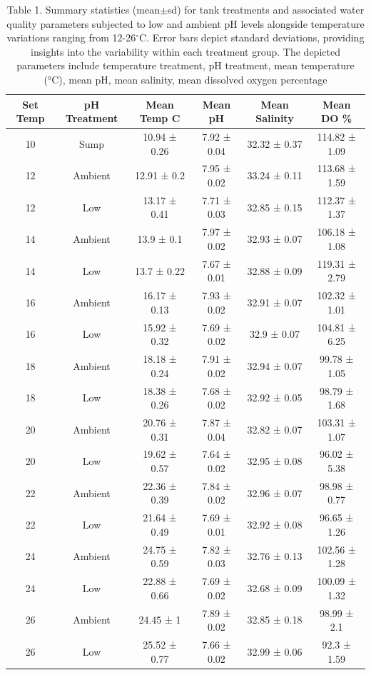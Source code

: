 \documentclass[
  12pt,
]{article}
\begin{document}
\begin{table}[!ht]
    \centering
    \begin{tabular}{|c|c|c|c|c|c|}
    \hline
        \textbf{Set Temp} & \textbf{pH Treatment} & \textbf{Mean Temp C} & \textbf{Mean pH} & \textbf{Mean Salinity} & \textbf{Mean DO \%} \\ \hline
        10 & Sump & 10.94 ± 0.26 & 7.92 ± 0.04 & 32.32 ± 0.37 & 114.82 ± 1.09 \\ \hline
        12 & Ambient & 12.91 ± 0.2 & 7.95 ± 0.02 & 33.24 ± 0.11 & 113.68 ± 1.59 \\ \hline
        12 & Low & 13.17 ± 0.41 & 7.71 ± 0.03 & 32.85 ± 0.15 & 112.37 ± 1.37 \\ \hline
        14 & Ambient & 13.9 ± 0.1 & 7.97 ± 0.02 & 32.93 ± 0.07 & 106.18 ± 1.08 \\ \hline
        14 & Low & 13.7 ± 0.22 & 7.67 ± 0.01 & 32.88 ± 0.09 & 119.31 ± 2.79 \\ \hline
        16 & Ambient & 16.17 ± 0.13 & 7.93 ± 0.02 & 32.91 ± 0.07 & 102.32 ± 1.01 \\ \hline
        16 & Low & 15.92 ± 0.32 & 7.69 ± 0.02 & 32.9 ± 0.07 & 104.81 ± 6.25 \\ \hline
        18 & Ambient & 18.18 ± 0.24 & 7.91 ± 0.02 & 32.94 ± 0.07 & 99.78 ± 1.05 \\ \hline
        18 & Low & 18.38 ± 0.26 & 7.68 ± 0.02 & 32.92 ± 0.05 & 98.79 ± 1.68 \\ \hline
        20 & Ambient & 20.76 ± 0.31 & 7.87 ± 0.04 & 32.82 ± 0.07 & 103.31 ± 1.07 \\ \hline
        20 & Low & 19.62 ± 0.57 & 7.64 ± 0.02 & 32.95 ± 0.08 & 96.02 ± 5.38 \\ \hline
        22 & Ambient & 22.36 ± 0.39 & 7.84 ± 0.02 & 32.96 ± 0.07 & 98.98 ± 0.77 \\ \hline
        22 & Low & 21.64 ± 0.49 & 7.69 ± 0.01 & 32.92 ± 0.08 & 96.65 ± 1.26 \\ \hline
        24 & Ambient & 24.75 ± 0.59 & 7.82 ± 0.03 & 32.76 ± 0.13 & 102.56 ± 1.28 \\ \hline
        24 & Low & 22.88 ± 0.66 & 7.69 ± 0.02 & 32.68 ± 0.09 & 100.09 ± 1.32 \\ \hline
        26 & Ambient & 24.45 ± 1 & 7.89 ± 0.02 & 32.85 ± 0.18 & 98.99 ± 2.1 \\ \hline
        26 & Low & 25.52 ± 0.77 & 7.66 ± 0.02 & 32.99 ± 0.06 & 92.3 ± 1.59 \\ \hline
    \end{tabular}
    \caption{Table 1. Summary statistics (mean$\pm$sd) for tank treatments and associated water quality parameters subjected to low and ambient pH levels alongside temperature variations ranging from 12-26$^\circ$C. Error bars depict standard deviations, providing insights into the variability within each treatment group. The depicted parameters include temperature treatment, pH treatment, mean temperature (°C), mean pH, mean salinity, mean dissolved oxygen percentage}
    \label{meso-stat-summary}
\end{table}
\end{document}
